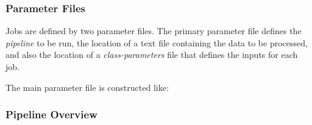\documentclass[11pt]{article}
\begin{document}
\subsubsection{Parameter Files}

Jobs are defined by two parameter files. The primary parameter file defines the \textit{pipeline} to be run, the location of a text file containing the data to be processed, and also the location of a \textit{class-parameters} file that defines the inputs for each job.

The main parameter file is constructed like:

{\center
\noindent{}
}



\subsubsection{Pipeline Overview}
\end{document}
